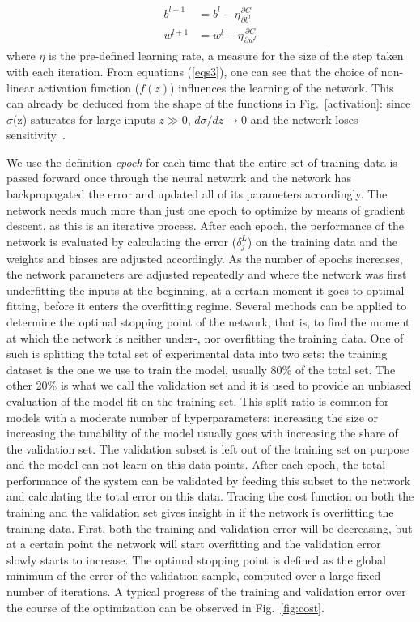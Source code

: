 \begin{align}
\begin{split}
 b^{l+1} &= b^l - \eta \frac{\partial C}{\partial b^l}
 \\
 w^{l+1} &= w^l - \eta \frac{\partial C}{\partial w^l}
\end{split}
\end{align}
where $\eta$ is the pre-defined learning rate, a measure for the size 
of the step taken with each iteration.
From equations (\ref{eqs3}), one can see that the choice of non-linear 
activation function ($f(z)$) influences the learning of the network. 
%
This can already be deduced from the shape of the functions in Fig.~\ref{activation}: 
since $\sigma$(z) saturates for large inputs $z\gg0$, 
$d\sigma/dz\rightarrow0$ and the network loses sensitivity~\cite{juan}.



We use the definition {\it epoch} for each time that
the entire set of training data is passed forward once through the neural network 
and the network has backpropagated the error and updated all of its parameters
accordingly. 
%
The network needs much more than just one epoch to optimize by means of 
gradient descent, as this is an iterative process. 
%
After each epoch, the performance of the network is evaluated by calculating
the error ($ \delta_j^L$) on the training data and the weights and biases
are adjusted accordingly.
%
As the number of epochs increases, the network parameters are adjusted
repeatedly and where the network was first underfitting the inputs at
the beginning, at a certain moment it goes to optimal fitting,
before it enters the overfitting regime.
%
Several methods can be applied to determine the optimal stopping point
of the network, that is, to find the moment at which the network is
neither under-, nor overfitting the training data. 
%
One of such is splitting the total set of experimental data into two sets:
the training dataset is the one we use to train the model, usually
80\% of the total set.
%
The other 20\% is what we call the validation set and it is used to provide
an unbiased evaluation of the model fit on the training set. 
%
This split ratio is common for models with a moderate number of hyperparameters:
increasing the size or increasing the tunability of the model usually goes with increasing the share of the
validation set. 
%
The validation subset is left out of the training set on purpose and the model
can not learn on this data points.
%
After each epoch, the total performance of the
system can be validated by feeding this subset to the network and calculating
the total error on this data.
%
Tracing the cost function on both the training and the validation set 
gives insight in if the network is overfitting the training data.
First, both the training and validation error will be decreasing, 
but at a certain point the network will start overfitting and the
validation error slowly starts to increase. 
%
The optimal stopping point is defined as the global minimum of the 
error of the validation sample, computed over a large fixed number of 
iterations.
%
A typical progress of the training and validation error over the 
course of the optimization can be observed in Fig.~\ref{fig:cost}.

